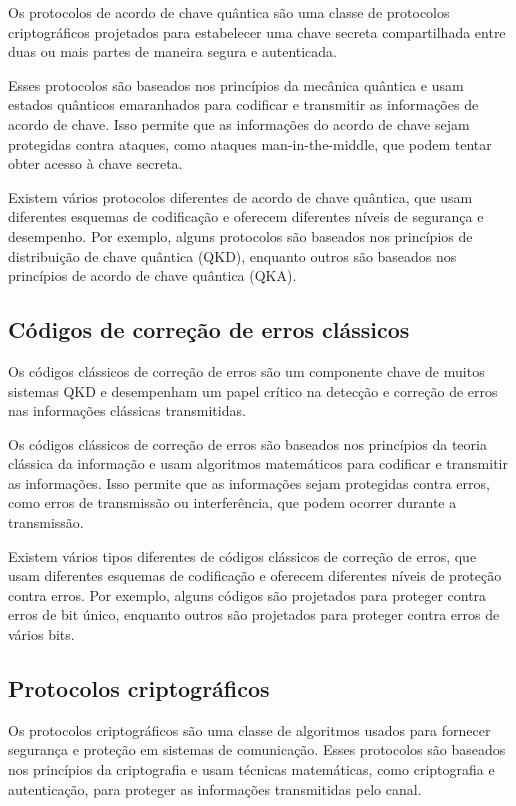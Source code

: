 Os protocolos de acordo de chave quântica são uma classe de protocolos criptográficos projetados para estabelecer uma chave secreta compartilhada entre duas ou mais partes de maneira segura e autenticada.

Esses protocolos são baseados nos princípios da mecânica quântica e usam estados quânticos emaranhados para codificar e transmitir as informações de acordo de chave. Isso permite que as informações do acordo de chave sejam protegidas contra ataques, como ataques man-in-the-middle, que podem tentar obter acesso à chave secreta.

Existem vários protocolos diferentes de acordo de chave quântica, que usam diferentes esquemas de codificação e oferecem diferentes níveis de segurança e desempenho. Por exemplo, alguns protocolos são baseados nos princípios de distribuição de chave quântica (QKD), enquanto outros são baseados nos princípios de acordo de chave quântica (QKA).

\subsection{Códigos de correção de erros clássicos}

Os códigos clássicos de correção de erros são um componente chave de muitos sistemas QKD e desempenham um papel crítico na detecção e correção de erros nas informações clássicas transmitidas.

Os códigos clássicos de correção de erros são baseados nos princípios da teoria clássica da informação e usam algoritmos matemáticos para codificar e transmitir as informações. Isso permite que as informações sejam protegidas contra erros, como erros de transmissão ou interferência, que podem ocorrer durante a transmissão.

Existem vários tipos diferentes de códigos clássicos de correção de erros, que usam diferentes esquemas de codificação e oferecem diferentes níveis de proteção contra erros. Por exemplo, alguns códigos são projetados para proteger contra erros de bit único, enquanto outros são projetados para proteger contra erros de vários bits.

\subsection{Protocolos criptográficos}

Os protocolos criptográficos são uma classe de algoritmos usados para fornecer segurança e proteção em sistemas de comunicação. Esses protocolos são baseados nos princípios da criptografia e usam técnicas matemáticas, como criptografia e autenticação, para proteger as informações transmitidas pelo canal.

